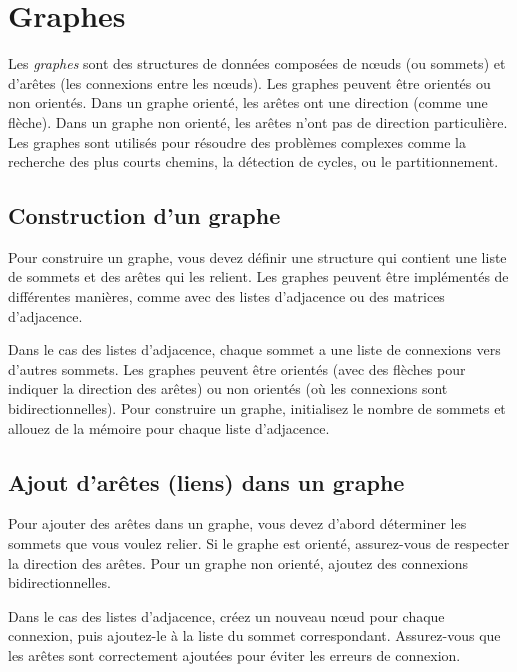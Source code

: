 \section{Graphes}

Les \emph{graphes} sont des structures de données composées de nœuds (ou sommets) et d'arêtes (les connexions entre les nœuds). Les graphes peuvent être orientés ou non orientés. Dans un graphe orienté, les arêtes ont une direction (comme une flèche). Dans un graphe non orienté, les arêtes n'ont pas de direction particulière. Les graphes sont utilisés pour résoudre des problèmes complexes comme la recherche des plus courts chemins, la détection de cycles, ou le partitionnement.


\subsection{Construction d'un graphe}
Pour construire un graphe, vous devez définir une structure qui contient une liste de sommets et des arêtes qui les relient. Les graphes peuvent être implémentés de différentes manières, comme avec des listes d'adjacence ou des matrices d'adjacence.

Dans le cas des listes d'adjacence, chaque sommet a une liste de connexions vers d'autres sommets. Les graphes peuvent être orientés (avec des flèches pour indiquer la direction des arêtes) ou non orientés (où les connexions sont bidirectionnelles). Pour construire un graphe, initialisez le nombre de sommets et allouez de la mémoire pour chaque liste d'adjacence.

\subsection{Ajout d'arêtes (liens) dans un graphe}
Pour ajouter des arêtes dans un graphe, vous devez d'abord déterminer les sommets que vous voulez relier. Si le graphe est orienté, assurez-vous de respecter la direction des arêtes. Pour un graphe non orienté, ajoutez des connexions bidirectionnelles. 

Dans le cas des listes d'adjacence, créez un nouveau nœud pour chaque connexion, puis ajoutez-le à la liste du sommet correspondant. Assurez-vous que les arêtes sont correctement ajoutées pour éviter les erreurs de connexion.

